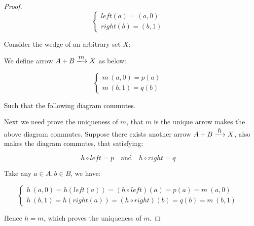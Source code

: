 \documentclass[UTF8]{article}
\begin{document}
\begin{proof}
\[
\begin{cases}
left(a) = (a, 0) \\
right(b) = (b, 1)
\end{cases}
\]

Consider the wedge of an arbitrary set $X$:

\begin{center}
\end{center}

We define arrow $A + B \arrowto{m} X$ as below:

\[
\begin{cases}
m\ (a, 0) = p(a) \\
m\ (b, 1) = q(b)
\end{cases}
\]

Such that the following diagram commutes.

\begin{center}
\end{center}

Next we need prove the uniqueness of $m$, that $m$ is the unique arrow makes the above diagram commutes. Suppose there exists another arrow $A + B \arrowto{h} X$, also makes the diagram commutes, that satisfying:

\[
h \circ left = p \quad \text{and} \quad h \circ right = q
\]

Take any $a \in A, b \in B$, we have:

\[
\begin{cases}
h\ (a, 0) = h(left(a)) = (h \circ left)(a) = p(a) = m\ (a, 0) \\
h\ (b, 1) = h(right(a)) = (h \circ right)(b) = q(b) = m\ (b, 1)
\end{cases}
\]

Hence $h = m$, which proves the uniqueness of $m$.
\end{proof}

\ifx\wholebook\relax \else

\expandafter\enddocument

\fi
\end{document}
